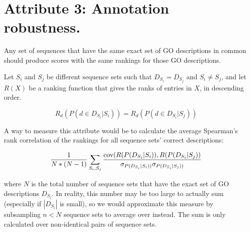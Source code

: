 \documentclass{specification}
\begin{document}


\section*{Attribute 3: Annotation robustness.}

Any set of sequences that have the same exact set of GO descriptions in common should produce scores with the same rankings for those GO descriptions.

Let $S_i$ and $S_j$ be different sequence sets such that $D_{S_i} = D_{S_j}$ and $S_i \neq S_j$, and let $R(X)$ be a ranking function that gives the ranks of entries in $X$, in descending order.

\[R_{d}(P(d \in D_{S_i} | S_i)) = R_{d}(P(d \in D_{S_i} | S_j))\]

A way to measure this attribute would be to calculate the average Spearman's rank correlation of the rankings for all sequence sets' correct descriptions: 

\[\frac{1}{N*(N-1)}\sum_{S_i, S_j} \frac{\textnormal{cov}(R(P(D_{S_i} | S_i)), R(P(D_{S_i} | S_j))}{\sigma_{P(D_{S_i} | S_i))}\sigma_{P(D_{S_i} | S_j))}}\]

where $N$ is the total number of sequence sets that have the exact set of GO descriptions $D_{S_i}$. In reality, this number may be too large to actually sum (especially if $|D_{S_i}|$ is small), so we would approximate this measure by subsampling $n < N$ sequence sets to average over instead. The sum is only calculated over non-identical pairs of sequence sets.

%
%
%
%
%
\end{document}
